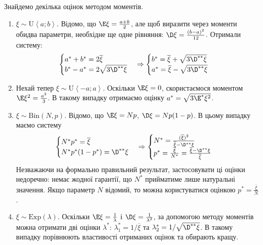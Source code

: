 \begin{example}
    Знайдемо декілька оцінок методом моментів.
    \begin{enumerate}
        \item $\xi \sim \mathrm{U}\left< a; b\right>$. Відомо, що $\E \xi = \frac{a+b}{2}$, але щоб виразити через моменти обидва параметри, необхідне ще одне рівняння:
        $\D \xi = \frac{(b-a)^2}{12}$. Отримали систему:
        $$ \begin{cases}
            a^* + b^* = 2\overline{\xi} \\
            b^* - a^* = 2\sqrt{3 \D^{**} \xi}
        \end{cases} \Rightarrow
        \begin{cases}
            b^* = \overline{\xi} + \sqrt{3 \D^{**} \xi} \\
            a^* = \overline{\xi} - \sqrt{3 \D^{**} \xi}
        \end{cases}$$
        \item Нехай тепер $\xi \sim \mathrm{U}\left< -a; a\right>$. Оскільки $\E\xi = 0$, скористаємося моментом $\E\xi^2 = \frac{a^2}{3}$. В такому випадку
        отримаємо оцінку $a^* = \sqrt{3 \E^{*}\xi^2}$.
        \item $\xi \sim \mathrm{Bin}(N, p)$. Відомо, що $\E \xi = Np$, $\D \xi = Np(1-p)$. В цьому випадку маємо систему 
        $$\begin{cases}
            N^* p^* = \overline{\xi} \\
            N^* p^* (1-p^*) = \D^{**} \xi 
        \end{cases} \Rightarrow
        \begin{cases}
            N^* = \frac{(\overline{\xi})^2}{\overline{\xi} - \D^{**}\xi} \\
            p^* = \frac{\overline{\xi}}{N^*} = \frac{\overline{\xi} - \D^{**}\xi}{\overline{\xi}}
        \end{cases}$$
        Незважаючи на формально правильний результат, застосовувати ці оцінки недоречно: немає жодної гарантії, що $N^*$ прийматиме лише натуральні значення.
        Якщо параметр $N$ відомий, то можна користуватися оцінкою $p^* = \frac{\overline{\xi}}{N}$.
        \item $\xi \sim \mathrm{Exp}(\lambda)$. Оскільки $\E \xi = \frac{1}{\lambda}$ і $\D \xi = \frac{1}{\lambda^2}$, за допомогою методу моментів можна отримати дві оцінки $\lambda^*$:
        $\lambda_1^* = 1/{\overline{\xi}}$ та $\lambda_2^* = 1/{\sqrt{\D^{**}\xi}}$. В такому випадку порівнюють властивості отриманих оцінок та обирають кращу.
    \end{enumerate}
\end{example}
